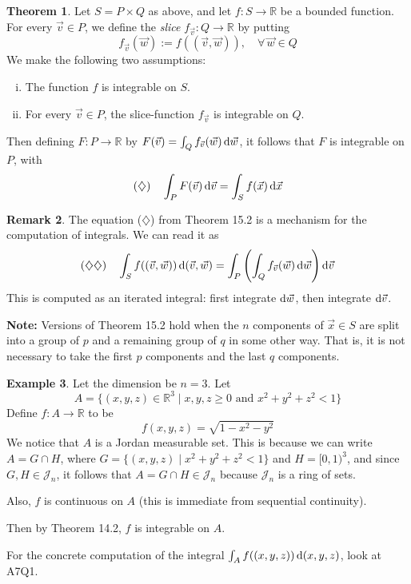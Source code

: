 \documentclass[11pt]{article}
\theoremstyle{definition}
\newtheorem{thm}{Theorem}[section]
\newtheorem{exmp}[thm]{Example}
\newtheorem{remark}[thm]{Remark}
\newcommand{\R}{\ensuremath{\mathbb{R}}}
\begin{document}
\begin{thm}
Let $S = P \times Q$ as above, and let $f : S \to \R$ be a bounded function. For every $\vec{v} \in P$, we define the \emph{slice} $f_{\vec{v}} : Q \to \R$ by putting
$$f_{\vec{v}}(\vec{w}) := f( (\vec{v}, \vec{w}) ), \quad \forall \, \vec{w} \in Q$$
We make the following two assumptions:\vspace{-1.5ex}
\begin{enumerate}[(i)]
\item The function $f$ is integrable on $S$.
\item For every $\vec{v} \in P$, the slice-function $f_{\vec{v}}$ is integrable on $Q$.
\end{enumerate}\vspace{-1.5ex}
Then defining $F : P \to \R$ by $F(\vec{v}) = \int_Q f_{\vec{v}}(\vec{w})\,{\rm d}\vec{w}$, it follows that $F$ is integrable on $P$, with
$$(\diamondsuit) \quad \int_P F(\vec{v})\,{\rm d}\vec{v} = \int_S f(\vec{x})\,{\rm d}\vec{x}$$
\end{thm}

\begin{remark}
The equation ($\diamondsuit$) from Theorem 15.2 is a mechanism for the computation of integrals. We can read it as
$$(\diamondsuit\diamondsuit) \quad \int_S f((\vec{v}, \vec{w}))\,{\rm d}(\vec{v}, \vec{w}) = \int_P \left(\int_Q f_{\vec{v}}(\vec{w})\,{\rm d}\vec{w}\right){\rm d}\vec{v}$$
This is computed as an iterated integral: first integrate ${\rm d}\vec{w}$, then integrate ${\rm d}\vec{v}$.

{\bf Note:} Versions of Theorem 15.2 hold when the $n$ components of $\vec{x} \in S$ are split into a group of $p$ and a remaining group of $q$ in some other way. That is, it is not necessary to take the first $p$ components and the last $q$ components.
\end{remark}

\begin{exmp}
Let the dimension be $n = 3$. Let
$$A = \{(x, y, z) \in \R^3 \mid x, y, z \geq 0 \text{ and } x^2 + y^2 + z^2 < 1\}$$
Define $f : A \to \R$ to be
$$f(x, y, z) = \sqrt{1 - x^2 - y^2}$$
We notice that $A$ is a Jordan measurable set. This is because we can write $A = G \cap H$, where $G = \{(x, y, z) \mid x^2 + y^2 + z^2 < 1\}$ and $H = [0, 1)^3$, and since $G, H \in \mathcal{J}_n$, it follows that $A = G \cap H \in \mathcal{J}_n$ because $\mathcal{J}_n$ is a ring of sets.

Also, $f$ is continuous on $A$ (this is immediate from sequential continuity).

Then by Theorem 14.2, $f$ is integrable on $A$.

For the concrete computation of the integral $\int_A f((x, y, z))\,{\rm d}(x,y,z)$, look at A7Q1.
\end{exmp}
\end{document}

